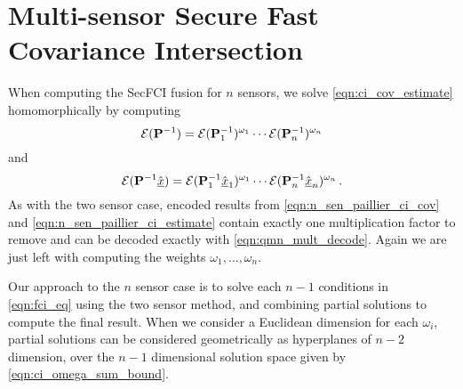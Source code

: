 \documentclass[letterpaper, 10 pt, conference]{ieeeconf}  %
\providecommand{\DIFadd}[1]{{\protect\color{blue}\uwave{#1}}} %
\providecommand{\DIFaddbegin}{} %
\providecommand{\DIFaddend}{} %
\begin{document}



\section{Multi-sensor Secure Fast Covariance Intersection} \label{sec:multi_secfci}
When computing the SecFCI fusion for $n$ sensors, we solve \eqref{eqn:ci_cov_estimate} homomorphically by computing
\begin{equation}
   \mathcal{E}({{\mathbf{P}}}^{-1}) = \mathcal{E}({{\mathbf{P}}}^{-1}_1)^{\omega_1}\cdots\mathcal{E}({{\mathbf{P}}}^{-1}_n)^{\omega_n} \label{eqn:n_sen_paillier_ci_cov}
\end{equation}
and
\begin{equation}
   \mathcal{E}({{\mathbf{P}}}^{-1}\hat{{\underline{x}}}) = \mathcal{E}({{\mathbf{P}}}^{-1}_1\hat{{\underline{x}}}_1)^{\omega_1}\cdots\mathcal{E}({{\mathbf{P}}}^{-1}_n\hat{{\underline{x}}}_n)^{\omega_n}\,. \label{eqn:n_sen_paillier_ci_estimate}
\end{equation}
As with the two sensor case, encoded results from \eqref{eqn:n_sen_paillier_ci_cov} and \eqref{eqn:n_sen_paillier_ci_estimate} contain exactly one multiplication factor to remove and can be decoded exactly with \eqref{eqn:qmn_mult_decode}. Again we are just left with computing the \DIFaddbegin \DIFadd{plaintext }\DIFaddend weights $\omega_1,\dots,\omega_n$.

Our approach to the $n$ sensor case is to solve each $n-1$ conditions in \eqref{eqn:fci_eq} using the two sensor method, and combining partial solutions to compute the final result. When we consider a Euclidean dimension for each $\omega_i$, partial solutions can be considered geometrically as hyperplanes of $n-2$ dimension, over the $n-1$ dimensional solution space given by \eqref{eqn:ci_omega_sum_bound}. 
\end{document}
